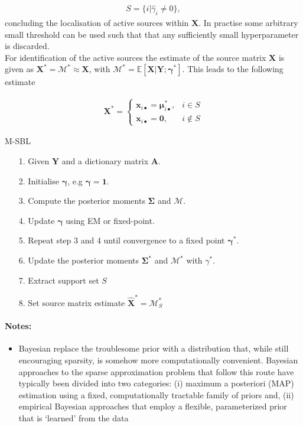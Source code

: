 \begin{align*}
S = \{ i \vert \hat{\gamma}_i \neq 0 \},
\end{align*}
concluding the localisation of active sources within $\textbf{X}$. In practise some arbitrary small threshold can be used such that that any sufficiently small hyperparameter is discarded.\\
For identification of the active sources the estimate of the source matrix $\textbf{X}$ is given as $\textbf{X}^\ast=\mathcal{M}^\ast \approx \textbf{X}$, with $\mathcal{M}^\ast = \mathbb{E}[\textbf{X}\vert \textbf{Y};\boldsymbol{\gamma}^\ast]$. This leads to the following estimate  

\begin{align*}
\mathbf{X}^\ast = 
\begin{cases}
\mathbf{x}_{i\bullet} = \boldsymbol{\mu}_{i \bullet}^\ast, & i \in S \\
\mathbf{x}_{i\bullet} = \mathbf{0}, & i \not \in S
\end{cases}
\end{align*}


\begin{algorithm}[H]
\caption{M-SBL}
\begin{itemize}
\item[1.] Given $\mathbf{Y}$ and a dictionary matrix $\mathbf{A}$.
\item[2.] Initialise $\boldsymbol{\gamma}$, e.g $\boldsymbol{\gamma} = \mathbf{1}$.
\item[3.] Compute the posterior moments $\boldsymbol{\Sigma}$ and $\mathcal{M}$.
\item[4.] Update $\boldsymbol{\gamma}$ using EM or fixed-point.
\item[5.] Repeat step 3 and 4 until convergence to a fixed point $\boldsymbol{\gamma}^\ast$.
\item[6.] Update the posterior moments $\boldsymbol{\Sigma}^\ast$ and $\mathcal{M}^\ast$ with $\gamma^\ast$.
\item[7.] Extract support set $S$
\item[8.] Set source matrix estimate $\hat{\mathbf{X}}^\ast = \mathcal{M}^\ast_S$
\end{itemize}
\end{algorithm}

\paragraph{Notes:}
\begin{itemize}
\item Bayesian replace the troublesome prior with a distribution that, while still encouraging sparsity, is somehow more computationally convenient. Bayesian approaches to the sparse approximation problem that follow this route have typically been divided into two categories: (i) maximum a posteriori (MAP) estimation using a fixed, computationally tractable family of priors and, (ii) empirical Bayesian approaches that employ a flexible, parameterized prior that is ‘learned’ from the data
\end{itemize}
